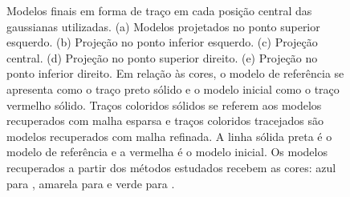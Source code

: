 \begin{figure}[H]
	
	\caption{Modelos finais em forma de traço em cada posição central das gaussianas utilizadas. (a) Modelos projetados no ponto superior esquerdo. (b) Projeção no ponto inferior esquerdo. (c) Projeção central. (d) Projeção no ponto superior direito. (e) Projeção no ponto inferior direito. Em relação às cores, o modelo de referência se apresenta como o traço preto sólido e o modelo inicial como o traço vermelho sólido. Traços coloridos sólidos se referem aos modelos recuperados com malha esparsa e traços coloridos tracejados são modelos recuperados com malha refinada. A linha sólida preta é o modelo de referência e a vermelha é o modelo inicial. Os modelos recuperados a partir dos métodos estudados recebem as cores: azul para , amarela para  e verde para . }
	\label{fig:model_profile}
\end{figure}



